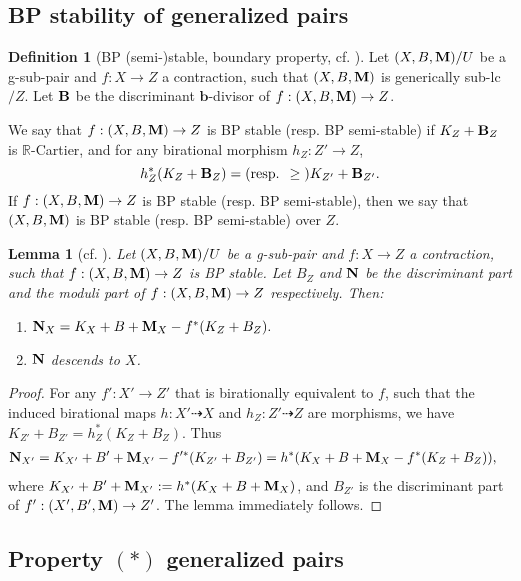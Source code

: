 \documentclass[11pt]{amsart}
\numberwithin{equation}{section}
\newcommand{\bb}{\bm{b}}
\newcommand{\Mm}{{\bf{M}}}
\newcommand{\Nn}{{\bf{N}}}
\newcommand{\Rr}{\mathbb{R}}
\newcommand{\Bb}{{\bf{B}}}
\newtheorem{lem}[thm]{Lemma}
\theoremstyle{definition}
\newtheorem{defn}[thm]{Definition}
\theoremstyle{definition}
\theoremstyle{definition}
\begin{document}
\subsection{BP stability of generalized pairs}

\begin{defn}[BP (semi-)stable, boundary property,  cf. {\cite[Definition 2.5]{ACSS21}}]\label{defn: bpstable}
Let $(X,B,\Mm)/U$ be a g-sub-pair and $f: X\rightarrow Z$ a contraction, such that $(X,B,\Mm)$ is generically sub-lc$/Z$. Let $\Bb$ be the discriminant $\bb$-divisor of $f: (X,B,\Mm)\rightarrow Z$.

We say that $f: (X,B,\Mm)\rightarrow Z$ is BP stable (resp. BP semi-stable) if $K_Z+\Bb_Z$ is $\Rr$-Cartier, and for any birational morphism $h_Z: Z'\rightarrow Z$,
$$h_Z^*(K_Z+\Bb_Z)=\text{(resp. }\geq\text{)} K_{Z'}+\Bb_{Z'}.$$
If $f: (X,B,\Mm)\rightarrow Z$ is BP stable (resp. BP semi-stable), then we say that $(X,B,\Mm)$ is BP stable (resp. BP semi-stable) over $Z$.
\end{defn}

\begin{lem}[cf. {\cite[Remark 2.6(2)]{ACSS21}}]\label{lem: bp stable implies descend}
Let $(X,B,\Mm)/U$ be a g-sub-pair and $f: X\rightarrow Z$ a contraction, such that $f: (X,B,\Mm)\rightarrow Z$ is BP stable. Let $B_Z$ and $\Nn$ be the discriminant part and the moduli part of $f: (X,B,\Mm)\rightarrow Z$ respectively. Then:
\begin{enumerate}
    \item $\Nn_X=K_X+B+\Mm_X-f^*(K_Z+B_Z).$
    \item $\Nn$ descends to $X$.
\end{enumerate}
\end{lem}
\begin{proof}
For any $f': X'\rightarrow Z'$ that is birationally equivalent to $f$, such that the induced birational maps $h: X'\dashrightarrow X$ and $h_Z: Z'\dashrightarrow Z$ are morphisms, we have $K_{Z'}+B_{Z'}=h_Z^*(K_{Z}+B_{Z})$. Thus
\begin{align*}
    \Nn_{X'}&=K_{X'}+B'+\Mm_{X'}-f'^*(K_{Z'}+B_{Z'})=h^*(K_X+B+\Mm_X-f^*(K_Z+B_Z)),
\end{align*}
where $K_{X'}+B'+\Mm_{X'}:=h^*(K_X+B+\Mm_X)$, and $B_{Z'}$ is the discriminant part of $f': (X',B',\Mm)\rightarrow Z'$. The lemma immediately follows.
\end{proof}

\subsection{Property \texorpdfstring{$(*)$}{} generalized pairs}
\end{document}
